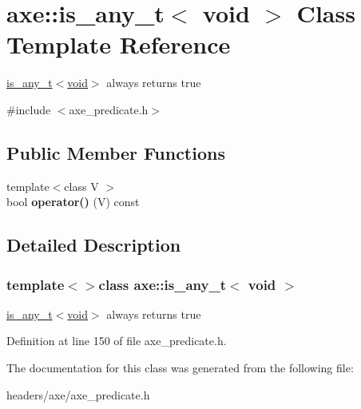 \hypertarget{classaxe_1_1is__any__t_3_01void_01_4}{\section{axe\+:\+:is\+\_\+any\+\_\+t$<$ void $>$ Class Template Reference}
\label{classaxe_1_1is__any__t_3_01void_01_4}
}


\hyperlink{classaxe_1_1is__any__t_3_01void_01_4}{is\+\_\+any\+\_\+t$<$void$>$} always returns true  




{\ttfamily \#include $<$axe\+\_\+predicate.\+h$>$}

\subsection*{Public Member Functions}
\begin{DoxyCompactItemize}
\item 
\hypertarget{classaxe_1_1is__any__t_3_01void_01_4_a1e93f9375ea31dde98583460dc400056}{{\footnotesize template$<$class V $>$ }\\bool {\bfseries operator()} (V) const }\label{classaxe_1_1is__any__t_3_01void_01_4_a1e93f9375ea31dde98583460dc400056}

\end{DoxyCompactItemize}


\subsection{Detailed Description}
\subsubsection*{template$<$$>$class axe\+::is\+\_\+any\+\_\+t$<$ void $>$}

\hyperlink{classaxe_1_1is__any__t_3_01void_01_4}{is\+\_\+any\+\_\+t$<$void$>$} always returns true 

Definition at line 150 of file axe\+\_\+predicate.\+h.



The documentation for this class was generated from the following file\+:\begin{DoxyCompactItemize}
\item 
headers/axe/axe\+\_\+predicate.\+h\end{DoxyCompactItemize}
